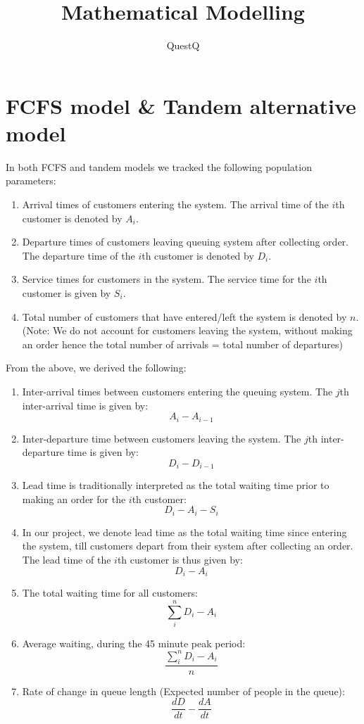 \documentclass{article}
\begin{document}
\pagecolor{ultramarine}
\title{Mathematical Modelling}
\author{QuestQ}
\date{}
\maketitle
\section*{FCFS model \& Tandem alternative model}
In both FCFS and tandem models we tracked the following population parameters:
\begin{enumerate}
    \item Arrival times of customers entering the system. The arrival time of the $i$th customer is denoted by $A_i$.
    \item Departure times of customers leaving queuing system after collecting order. The departure time of the $i$th customer is denoted by $D_i$.
    \item Service times for customers in the system. The service time for the $i$th customer is given by $S_i$.
    \item Total number of customers that have entered/left the system is denoted by $n$. (Note: We do not account for customers leaving the system, without making an order hence the total number of arrivals = total number of departures)
\end{enumerate}
From the above, we derived the following:
\begin{enumerate}
    \item Inter-arrival times between customers entering the queuing system. The $j$th inter-arrival time is given by: \[A_i-A_{i-1}\]
    \item Inter-departure time between customers leaving the system. The $j$th inter-departure time is given by: \[D_i-D_{i-1}\]
    \item Lead time is traditionally interpreted as the total waiting time prior to making an order for the $i$th customer:
    \[D_i-A_i-S_i\]
    \item In our project, we denote lead time as the total waiting time since entering the system, till customers depart from their system after collecting an order. 
    The lead time of the $i$th customer is thus given by: \[D_i-A_i\]
    \item The total waiting time for all customers: \[\sum_i^n D_i-A_i\]
    \item Average waiting, during the 45 minute peak period:
    \[\frac{\sum_i^n D_i-A_i}{n}\]
    \item Rate of change in queue length (Expected number of people in the queue):
    \[\frac{dD}{dt}-\frac{dA}{dt}\]
\end{enumerate}
\end{document}
